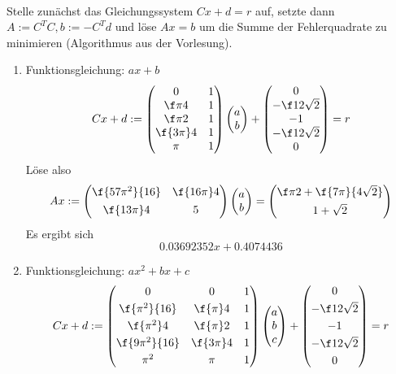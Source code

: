 \documentclass{mywork}
\begin{document}
	\newpage

	\begin{aufgabe}~
		
		Stelle zunächst das Gleichungssystem $Cx+d=r$ auf, setzte dann $A:=C^TC, b:=-C^Td$ und löse $Ax=b$ um die Summe der Fehlerquadrate zu minimieren (Algorithmus aus der Vorlesung).
		\begin{enumerate}
			\item
				Funktionsgleichung: $ax+b$
				\[
					Cx+d:=\begin{pmatrix}0&1\\\f\pi4&1\\\f\pi2&1\\\f{3\pi}4&1\\\pi&1\end{pmatrix}\begin{pmatrix}a\\b\end{pmatrix} + \begin{pmatrix}0\\-\f12\sqrt2\\-1\\-\f12\sqrt{2}\\0\end{pmatrix} = r
				\]
				Löse also
				\[
					Ax:=\begin{pmatrix}\f{57\pi^2}{16} & \f{16\pi}4 \\[0.4em]\f{13\pi}4 & 5\end{pmatrix}\begin{pmatrix}a\\b\end{pmatrix} = \begin{pmatrix}\f\pi2+\f{7\pi}{4\sqrt2}\\[0.4em]1+\sqrt2\end{pmatrix}
				\]
				Es ergibt sich
				\[
					0.03692352x + 0.4074436
				\]
			\item
				Funktionsgleichung: $ax^2+bx+c$
				\[
					Cx+d:=\begin{pmatrix}0&0&1\\[0.3em]\f{\pi^2}{16}&\f{\pi}4&1\\[0.3em]\f{\pi^2}4&\f{\pi}2&1\\[0.3em]\f{9\pi^2}{16}&\f{3\pi}4&1\\[0.3em]\pi^2&\pi&1\end{pmatrix}\begin{pmatrix}a\\b\\c\end{pmatrix}+\begin{pmatrix}0\\[0.3em]-\f12\sqrt2\\[0.3em]-1\\[0.3em]-\f12\sqrt{2}\\[0.3em]0\end{pmatrix} = r
\]
\end{enumerate}
\end{aufgabe}
\end{document}
